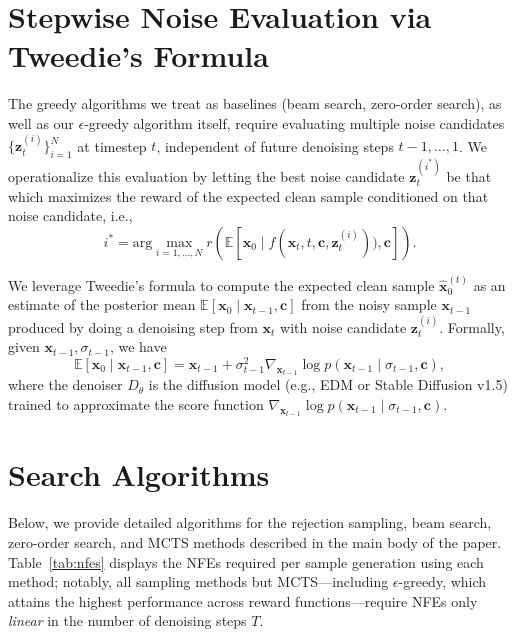 \documentclass{article}
\newcommand{\x}{\mathbf{x}}
\begin{document}
\section{Stepwise Noise Evaluation via Tweedie’s Formula}
\label{tweedie}

The greedy algorithms we treat as baselines (beam search, zero-order search), as well as our $\epsilon$-greedy algorithm itself, require evaluating multiple noise candidates $\{\mathbf{z}_t^{(i)}\}_{i=1}^N$ at timestep $t$, independent of future denoising  steps $t-1, \dots, 1$. We operationalize this evaluation by letting the best noise candidate $\mathbf{z}_t^{(i^*)}$ be that which maximizes the reward of the expected clean sample conditioned on that noise candidate, i.e.,
\begin{equation}
    i^* = \textrm{arg}\max_{i=1, \dots, N} r(\mathbb{E}[\x_0 \mid f(\mathbf{x}_t, t, \mathbf{c}, \mathbf{z}_t^{(i)})), \mathbf{c}]).
\end{equation}

We leverage Tweedie's formula \citep{tweedie} to compute the expected clean sample $\hat{\x}_0^{(t)}$ as an estimate of the posterior mean $\mathbb{E}[\x_0 \mid \x_{t-1}, \mathbf{c}]$ from the noisy sample $\x_{t-1}$ produced by doing a denoising step from $\x_t$ with noise candidate $\mathbf{z}_t^{(i)}$. Formally, given $\x_{t-1}, \sigma_{t-1}$, we have
\begin{equation*}
    \mathbb{E}[\x_0 \mid \x_{t-1}, \mathbf{c}] = \x_{t-1} + \sigma_{t-1}^2\nabla_{\x_{t-1}} \log p(\mathbf{x}_{t-1}\mid\sigma_{t-1}, \mathbf{c}),
\end{equation*}
where the denoiser $D_\theta$ is the diffusion model (e.g., EDM or Stable Diffusion v1.5) trained to approximate the score function $\nabla_{\x_{t-1}} \log p(\mathbf{x}_{t-1}\mid\sigma_{t-1}, \mathbf{c})$.


\section{Search Algorithms}
\label{app:baselines}

Below, we provide detailed algorithms for the rejection sampling, beam search, zero-order search, and MCTS methods described in the main body of the paper. Table~\ref{tab:nfes} displays the NFEs required per sample generation using each method; notably, all sampling methods but MCTS---including $\epsilon$-greedy, which attains the highest performance across reward functions---require NFEs only \textit{linear} in the number of denoising steps $T$.
\end{document}
